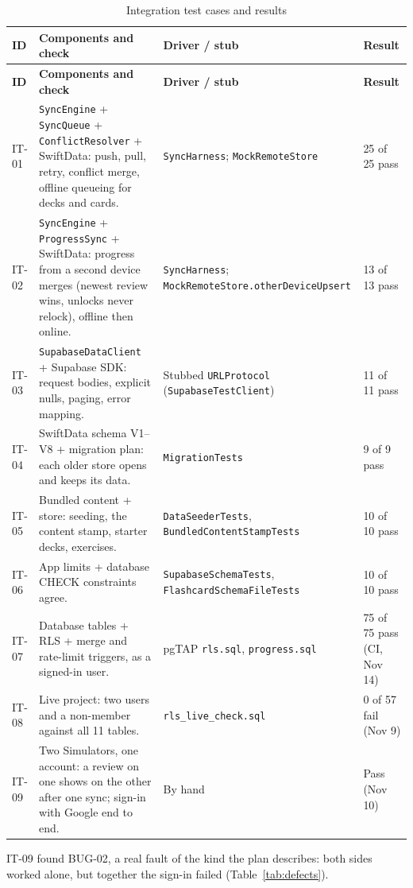 \documentclass[12pt,letterpaper]{article}
\begin{document}
\begin{xltabular}{\textwidth}{@{}L{1.1cm} Y L{3.4cm} L{2.2cm}@{}}
\caption{Integration test cases and results}\label{tab:inttests}\\
\toprule
\textbf{ID} & \textbf{Components and check} & \textbf{Driver / stub} & \textbf{Result} \\
\midrule
\endfirsthead
\toprule
\textbf{ID} & \textbf{Components and check} & \textbf{Driver / stub} & \textbf{Result} \\
\midrule
\endhead
\bottomrule
\endfoot
IT-01 & \texttt{SyncEngine} + \texttt{SyncQueue} + \texttt{ConflictResolver} + SwiftData: push, pull, retry, conflict merge, offline queueing for decks and cards. & \texttt{SyncHarness}; \texttt{MockRemoteStore} & 25 of 25 pass \\
IT-02 & \texttt{SyncEngine} + \texttt{ProgressSync} + SwiftData: progress from a second device merges (newest review wins, unlocks never relock), offline then online. & \texttt{SyncHarness}; \texttt{MockRemoteStore.otherDeviceUpsert} & 13 of 13 pass \\
IT-03 & \texttt{SupabaseDataClient} + Supabase SDK: request bodies, explicit nulls, paging, error mapping. & Stubbed \texttt{URLProtocol} (\texttt{SupabaseTestClient}) & 11 of 11 pass \\
IT-04 & SwiftData schema V1--V8 + migration plan: each older store opens and keeps its data. & \texttt{MigrationTests} & 9 of 9 pass \\
IT-05 & Bundled content + store: seeding, the content stamp, starter decks, exercises. & \texttt{DataSeederTests}, \texttt{BundledContentStampTests} & 10 of 10 pass \\
IT-06 & App limits + database CHECK constraints agree. & \texttt{SupabaseSchemaTests}, \texttt{FlashcardSchemaFileTests} & 10 of 10 pass \\
IT-07 & Database tables + RLS + merge and rate-limit triggers, as a signed-in user. & pgTAP \texttt{rls.sql}, \texttt{progress.sql} & 75 of 75 pass (CI, Nov 14) \\
IT-08 & Live project: two users and a non-member against all 11 tables. & \texttt{rls\_live\_check.sql} & 0 of 57 fail (Nov 9) \\
IT-09 & Two Simulators, one account: a review on one shows on the other after one sync; sign-in with Google end to end. & By hand & Pass (Nov 10) \\
\end{xltabular}

IT-09 found BUG-02, a real fault of the kind the plan describes: both sides worked
alone, but together the sign-in failed (Table~\ref{tab:defects}).
\end{document}
